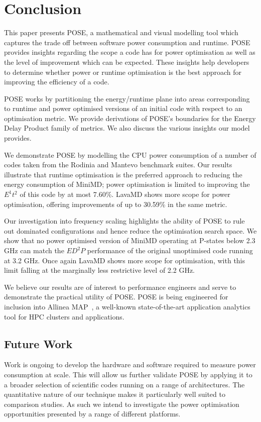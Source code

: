 \section{Conclusion}
\label{sec:conclusion}
\noindent
This paper presents POSE, a mathematical and visual modelling tool which captures the trade off between software power consumption and runtime.
POSE provides insights regarding the scope a code has for power optimisation as well as the level of improvement which can be expected.
These insights help developers to determine whether power or runtime optimisation is the best approach for improving the efficiency of a code.

POSE works by partitioning the energy/runtime plane into areas corresponding to runtime and power optimised versions of an initial code with respect to an optimisation metric.
We provide derivations of POSE's boundaries for the Energy Delay Product family of metrics.
We also discuss the various insights our model provides.

We demonstrate POSE by modelling the CPU power consumption of a number of codes taken from the Rodinia and Mantevo benchmark suites.  
Our results illustrate that runtime optimisation is the preferred approach to reducing the energy consumption of MiniMD; power optimisation is limited to improving the $E^1t^2$ of this code by at most 7.60\%.
LavaMD shows more scope for power optimisation, offering improvements of up to 30.59\% in the same metric. 

Our investigation into frequency scaling highlights the ability of POSE to rule out dominated configurations and hence reduce the optimisation search space.
We show that no power optimised version of MiniMD operating at P-states below 2.3 GHz can match the $ED^2P$ performance of the original unoptimised code running at 3.2 GHz.
Once again LavaMD shows more scope for optimisation, with this limit falling at the marginally less restrictive level of 2.2 GHz.

We believe our results are of interest to performance engineers and serve to demonstrate the practical utility of POSE.
POSE is being engineered for inclusion into Allinea MAP~\cite{january:2014aa}, a well-known state-of-the-art application analytics tool for HPC clusters and applications.

\subsection*{Future Work}
\noindent
Work is ongoing to develop the hardware and software required to measure power consumption at scale.
This will allow us further validate POSE by applying it to a broader selection of scientific codes running on a range of architectures.
The quantitative nature of our technique makes it particularly well suited to comparison studies.
As such we intend to investigate the power optimisation opportunities presented by a range of different platforms.

